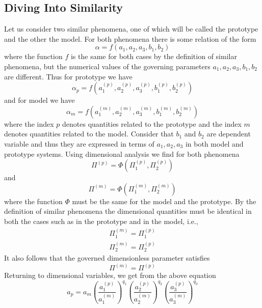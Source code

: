	\subsection{Diving Into Similarity}
	Let us consider two similar phenomena, one of which will be called the prototype and the other the model. For both phenomena there is some relation of the form
	\begin{equation}
		\alpha = f(a_1, a_2, a_3, b_1, b_2)
	\end{equation}
	where the function $f$ is the same for both cases by the definition of similar phenomena, but the numerical values of the governing parameters $a_1, a_2, a_3, b_1, b_2$ are different. Thus for prototype we have
	\begin{equation}
		\alpha_p = f(a_1^{(p)}, a_2^{(p)}, a_3^{(p)}, b_1^{(p)}, b_2^{(p)})
	\end{equation}
	 and for model we have
 	\begin{equation}
		 \alpha_m = f(a_1^{(m)}, a_2^{(m)}, a_3^{(m)}, b_1^{(m)}, b_2^{(m)})
	 \end{equation}
	where the index $p$ denotes quantities related to the prototype and the index $m$ denotes quantities related to the model. Consider that $b_1$ and $b_2$ are dependent variable and thus they are expressed in terms of $a_1, a_2, a_3$ in both model and prototype systems. Using dimensional analysis we find for both phenomena
	\begin{equation}
		\Pi^{(p)} = \Phi(\Pi_1^{(p)}, \Pi_2^{(p)})
	\end{equation}
	and
	\begin{equation}
		\Pi^{(m)} = \Phi(\Pi_1^{(m)}, \Pi_2^{(m)})
	\end{equation}
	where the function $\Phi$ must be the same for the  model and the prototype. By the definition of similar phenomena the dimensional quantities must be identical in both the cases such as in the prototype and in the model, i.e.,
	\begin{align}
		\Pi_1^{(m)} = \Pi_1^{(p)} \\
		\Pi_2^{(m)} = \Pi_2^{(p)} 
	\end{align}
	It also follows that the governed dimensionless parameter satisfies
	\begin{equation}
		\Pi^{(m)} = \Pi^{(p)}
	\end{equation}
	Returning to dimensional variables, we get from the above equation
	\begin{equation}
		a_p = a_m (\frac{a_1^{(p)}}{a_1^{(m)}})^{q_1} (\frac{a_2^{(p)}}{a_2^{(m)}})^{q_2} (\frac{a_3^{(p)}}{a_3^{(m)}})^{q_3}
	\end{equation}
